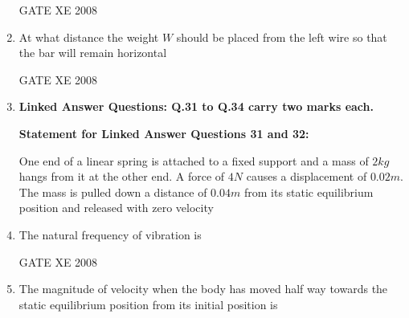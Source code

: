 \documentclass[12pt]{article}
\begin{document}
\begin{enumerate}[label=Q\arabic*.]
GATE XE 2008

\item At what distance the weight $W$ should be placed from the left wire so that the bar will remain horizontal  

\begin{enumerate}[label=(\Alph*)]
\end{enumerate}

GATE XE 2008

\item[] \textbf{\Large Linked Answer Questions: Q.31 to Q.34 carry two marks each.}

\textbf{Statement for Linked Answer Questions 31 and 32:}

One end of a linear spring is attached to a fixed support and a mass of $2 kg$ hangs from it at the other end. A force of $4 N$ causes a displacement of $0.02m$. The mass is pulled down a distance of $0.04 m$ from its static equilibrium position and released with zero velocity


\item The natural frequency of vibration is  

\begin{enumerate}[label=(\Alph*)]
\end{enumerate}

GATE XE 2008

\item The magnitude of velocity when the body has moved half way towards the static equilibrium position from its initial position is  

\begin{enumerate}[label=(\Alph*)]
\end{enumerate}


\end{enumerate}
\end{document}
